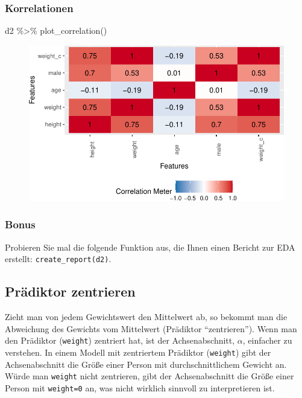 \documentclass[
  a4paper,
  DIV=11]{scrreprt}
\newenvironment{Shaded}{\begin{snugshade}}{\end{snugshade}}
\newcommand{\FunctionTok}[1]{\textcolor[rgb]{0.28,0.35,0.67}{#1}}
\newcommand{\NormalTok}[1]{\textcolor[rgb]{0.00,0.23,0.31}{#1}}
\newcommand{\SpecialCharTok}[1]{\textcolor[rgb]{0.37,0.37,0.37}{#1}}
\theoremstyle{definition}
\theoremstyle{remark}
\begin{document}
\hypertarget{korrelationen}{%
\subsubsection{Korrelationen}\label{korrelationen}}

\begin{Shaded}
\begin{Highlighting}[]
\NormalTok{d2 }\SpecialCharTok{\%\textgreater{}\%} \FunctionTok{plot\_correlation}\NormalTok{()}
\end{Highlighting}
\end{Shaded}

\begin{figure}[H]

{\centering \includegraphics{./lineare-modelle_files/figure-pdf/unnamed-chunk-6-1.pdf}

}

\end{figure}

\hypertarget{bonus}{%
\subsubsection{Bonus}\label{bonus}}

Probieren Sie mal die folgende Funktion aus, die Ihnen einen Bericht zur
EDA erstellt: \texttt{create\_report(d2)}.

\hypertarget{pruxe4diktor-zentrieren}{%
\subsection{Prädiktor zentrieren}\label{pruxe4diktor-zentrieren}}

Zieht man von jedem Gewichtswert den Mittelwert ab, so bekommt man die
Abweichung des Gewichts vom Mittelwert (Prädiktor ``zentrieren''). Wenn
man den Prädiktor (\texttt{weight}) zentriert hat, ist der
Achsenabschnitt, \(\alpha\), einfacher zu verstehen. In einem Modell mit
zentriertem Prädiktor (\texttt{weight}) gibt der Achsenabschnitt die
Größe einer Person mit durchschnittlichem Gewicht an. Würde man
\texttt{weight} nicht zentrieren, gibt der Achsenabschnitt die Größe
einer Person mit \texttt{weight=0} an, was nicht wirklich sinnvoll zu
interpretieren ist.
\end{document}
